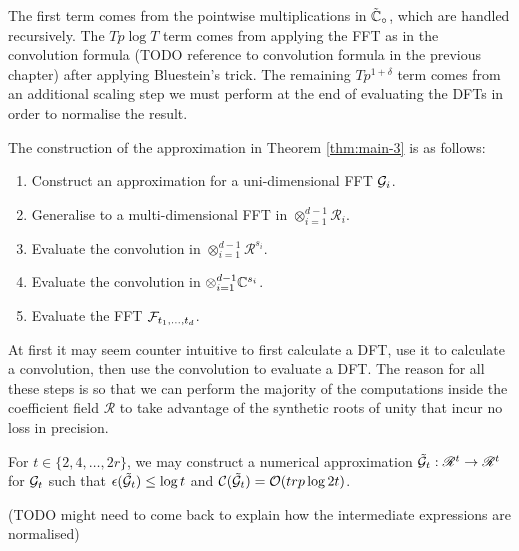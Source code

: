 The first term comes from the pointwise multiplications in $\tilde{{\mathbb C}}_\circ$, which are handled recursively. The $Tp \log T$ term comes from applying the FFT as in the convolution formula (TODO reference to convolution formula in the previous chapter) after applying Bluestein's trick. The remaining $Tp^{1 + \delta}$ term comes from an additional scaling step we must perform at the end of evaluating the DFTs in order to normalise the result.

The construction of the approximation in Theorem \ref{thm:main-3} is as follows:
\begin{enumerate}
    \item Construct an approximation for a uni-dimensional FFT $\mathcal G_i$.
    \item Generalise to a multi-dimensional FFT in $\otimes_{i=1}^{d-1} \mathscr{R}_i$.
    \item Evaluate the convolution in $\otimes_{i=1}^{d-1} \mathscr{R}^{s_i}$.
    \item Evaluate the convolution in $\otimes_{i=1}^{d-1} {\mathbb C}^{s_i}$.
    \item Evaluate the FFT $\mathcal F_{t_1, \ldots, t_d}$.
\end{enumerate}
At first it may seem counter intuitive to first calculate a DFT, use it to calculate a convolution, then use the convolution to evaluate a DFT. The reason for all these steps is so that we can perform the majority of the computations inside the coefficient field $\mathscr{R}$ to take advantage of the synthetic roots of unity that incur no loss in precision.

\begin{lemma}
    For $t \in \{2, 4, \ldots, 2r\}$, we may construct a numerical approximation $\tilde{\mathcal G}_t: \mathscr{R}^t \to \mathscr{R}^t$ for $\mathcal G_t$ such that $\epsilon (\tilde{\mathcal G}_t) \leq \log t$ and $\mathcal C(\tilde{\mathcal G}_t)= \mathcal O(trp \log 2t)$.
\end{lemma}

(TODO might need to come back to explain how the intermediate expressions are normalised)
\medskip


